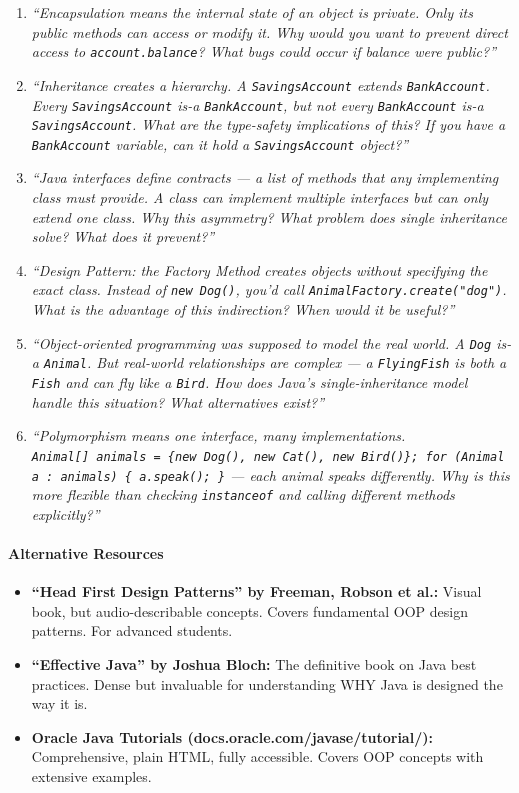 \documentclass[
  justified,
  openright,
]{tufte-book}
\let\paragraph\paragraph
\let\paragraph\paragraph
\providecommand{\tightlist}{%
  \setlength{\itemsep}{0pt}\setlength{\parskip}{0pt}}
\begin{document}
\begin{enumerate}
\def\labelenumi{\arabic{enumi}.}
\item
  \emph{``Encapsulation means the internal state of an object is
  private. Only its public methods can access or modify it. Why would
  you want to prevent direct access to \texttt{account.balance}? What
  bugs could occur if balance were public?''}
\item
  \emph{``Inheritance creates a hierarchy. A \texttt{SavingsAccount}
  extends \texttt{BankAccount}. Every \texttt{SavingsAccount} is-a
  \texttt{BankAccount}, but not every \texttt{BankAccount} is-a
  \texttt{SavingsAccount}. What are the type-safety implications of
  this? If you have a \texttt{BankAccount} variable, can it hold a
  \texttt{SavingsAccount} object?''}
\item
  \emph{``Java interfaces define contracts --- a list of methods that
  any implementing class must provide. A class can implement multiple
  interfaces but can only extend one class. Why this asymmetry? What
  problem does single inheritance solve? What does it prevent?''}
\item
  \emph{``Design Pattern: the Factory Method creates objects without
  specifying the exact class. Instead of \texttt{new\ Dog()}, you'd call
  \texttt{AnimalFactory.create("dog")}. What is the advantage of this
  indirection? When would it be useful?''}
\item
  \emph{``Object-oriented programming was supposed to model the real
  world. A \texttt{Dog} is-a \texttt{Animal}. But real-world
  relationships are complex --- a \texttt{FlyingFish} is both a
  \texttt{Fish} and can fly like a \texttt{Bird}. How does Java's
  single-inheritance model handle this situation? What alternatives
  exist?''}
\item
  \emph{``Polymorphism means one interface, many implementations.
  \texttt{Animal{[}{]}\ animals\ =\ \{new\ Dog(),\ new\ Cat(),\ new\ Bird()\};\ for\ (Animal\ a\ :\ animals)\ \{\ a.speak();\ \}}
  --- each animal speaks differently. Why is this more flexible than
  checking \texttt{instanceof} and calling different methods
  explicitly?''}
\end{enumerate}

\paragraph{Alternative Resources}\label{alternative-resources-6}

\begin{itemize}
\tightlist
\item
  \textbf{``Head First Design Patterns'' by Freeman, Robson et al.:}
  Visual book, but audio-describable concepts. Covers fundamental OOP
  design patterns. For advanced students.
\item
  \textbf{``Effective Java'' by Joshua Bloch:} The definitive book on
  Java best practices. Dense but invaluable for understanding WHY Java
  is designed the way it is.
\item
  \textbf{Oracle Java Tutorials (docs.oracle.com/javase/tutorial/):}
  Comprehensive, plain HTML, fully accessible. Covers OOP concepts with
  extensive examples.
\end{itemize}
\end{document}
